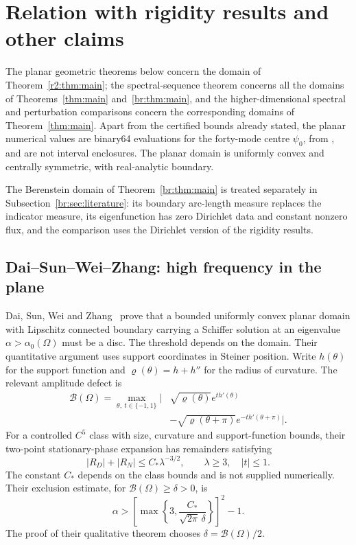 \section{Relation with rigidity results and other claims}\label{sec:rigidity}\label{r2:sec:rigidity}
The planar geometric theorems below concern the domain of Theorem~\ref{r2:thm:main}; the spectral-sequence theorem concerns all the domains of Theorems~\ref{thm:main} and~\ref{br:thm:main}, and the higher-dimensional spectral and perturbation comparisons concern the corresponding domains of Theorem~\ref{thm:main}. Apart from the certified bounds already stated, the planar numerical values are binary64 evaluations for the forty-mode centre $\psi_0$, from , and are not interval enclosures. The planar domain is uniformly convex and centrally symmetric, with real-analytic boundary.

The Berenstein domain of Theorem~\ref{br:thm:main} is treated separately in Subsection~\ref{br:sec:literature}: its boundary arc-length measure replaces the indicator measure, its eigenfunction has zero Dirichlet data and constant nonzero flux, and the comparison uses the Dirichlet version of the rigidity results.

\subsection{Dai--Sun--Wei--Zhang: high frequency in the plane}
Dai, Sun, Wei and Zhang~\cite[Theorem 1.2, version 2]{DSWZ25} prove that a bounded uniformly convex planar domain with Lipschitz connected boundary carrying a Schiffer solution at an eigenvalue $\alpha>\alpha_0(\Omega)$ must be a disc. The threshold depends on the domain. Their quantitative argument uses support coordinates in Steiner position. Write $h(\theta)$ for the support function and $\varrho(\theta)=h+h''$ for the radius of curvature. The relevant amplitude defect is
\begin{equation}\label{r2:eq:DSWZ-defect}
 \begin{split}
 \mathcal B(\Omega)=\max_{\theta,\ t\in\{-1,1\}}\bigl|
 &\sqrt{\varrho(\theta)}e^{t h'(\theta)}\\
 &-\sqrt{\varrho(\theta+\pi)}e^{-t h'(\theta+\pi)}\bigr|.
 \end{split}
\end{equation}
For a controlled $C^5$ class with size, curvature and support-function bounds, their two-point stationary-phase expansion has remainders satisfying
\begin{equation}\label{r2:eq:remainder}
 |R_D|+|R_N|\le C_*\lambda^{-3/2},\qquad
 \lambda\ge3,\quad |t|\le1.
\end{equation}
The constant $C_*$ depends on the class bounds and is not supplied numerically. Their exclusion estimate, for $\mathcal B(\Omega)\ge\delta>0$, is
\begin{equation}\label{r2:eq:DSWZ-threshold}
 \alpha>\left[\max\left\{3,\frac{C_*}{\sqrt{2\pi}\,\delta}\right\}\right]^2-1.
\end{equation}
The proof of their qualitative theorem chooses $\delta=\mathcal B(\Omega)/2$.

